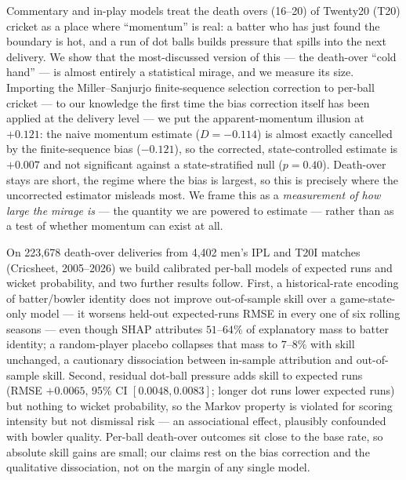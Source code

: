 Commentary and in-play models treat the death overs (16--20) of Twenty20 (T20)
cricket as a place where ``momentum'' is real: a batter who has just found the
boundary is hot, and a run of dot balls builds pressure that spills into the next
delivery. We show that the most-discussed version of this --- the death-over
``cold hand'' --- is almost entirely a statistical mirage, and we measure its
size. Importing the Miller--Sanjurjo finite-sequence selection correction to
per-ball cricket --- to our knowledge the first time the bias correction itself
has been applied at the delivery level --- we put the apparent-momentum illusion
at $+0.121$: the naive momentum estimate ($D=-0.114$) is almost exactly cancelled
by the finite-sequence bias ($-0.121$), so the corrected, state-controlled
estimate is $+0.007$ and not significant against a state-stratified null
($p=0.40$). Death-over stays are short, the regime where the bias is largest, so
this is precisely where the uncorrected estimator misleads most. We frame this as
a \emph{measurement of how large the mirage is} --- the quantity we are powered to
estimate --- rather than as a test of whether momentum can exist at all.

On 223{,}678 death-over deliveries from 4{,}402 men's IPL and T20I matches
(Cricsheet, 2005--2026) we build calibrated per-ball models of expected runs and
wicket probability, and two further results follow. First, a historical-rate
encoding of batter/bowler identity does not improve out-of-sample skill over a
game-state-only model --- it worsens held-out expected-runs RMSE in every one of
six rolling seasons --- even though SHAP attributes $51$--$64\%$ of explanatory
mass to batter identity; a random-player placebo collapses that mass to $7$--$8\%$
with skill unchanged, a cautionary dissociation between in-sample attribution and
out-of-sample skill. Second, residual dot-ball pressure adds skill to expected
runs (RMSE $+0.0065$, 95\% CI $[0.0048, 0.0083]$; longer dot runs lower expected
runs) but nothing to wicket probability, so the Markov property is violated for
scoring intensity but not dismissal risk --- an associational effect, plausibly
confounded with bowler quality. Per-ball death-over outcomes sit close to the base
rate, so absolute skill gains are small; our claims rest on the bias correction
and the qualitative dissociation, not on the margin of any single model.
